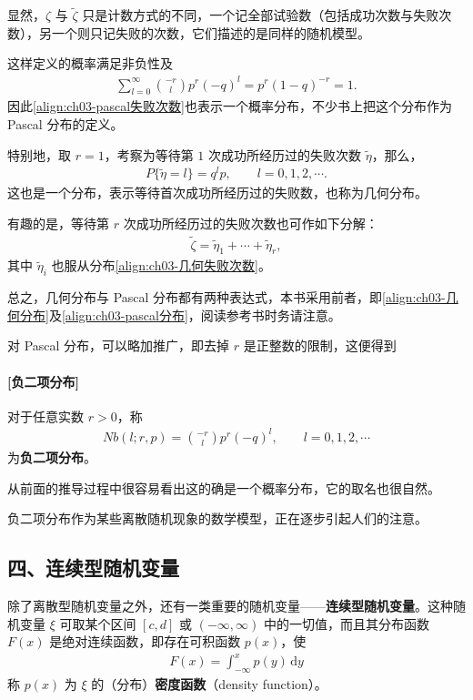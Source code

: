 \documentclass[../../main.tex]{subfiles}
\begin{document}
显然，$\zeta$ 与 $\tilde{\zeta}$ 只是计数方式的不同，一个记全部试验数（包括成功次数与失败次数），另一个则只记失败的次数，它们描述的是同样的随机模型。

这样定义的概率满足非负性及
\begin{align*}\sum_{l=0}^{\infty}\binom{-r}{l}p^{r}(-q)^{l}=p^{r}(1-q)^{-r}=1.\end{align*}
因此\eqref{align:ch03-pascal失败次数}也表示一个概率分布，不少书上把这个分布作为 Pascal 分布的定义。

特别地，取 $r=1$，考察为等待第 $1$ 次成功所经历过的失败次数 $\tilde{\eta}$，那么，
\begin{align}
P\{\tilde{\eta}=l\}=q^{l}p,\qquad l=0,1,2,\cdots.\label{align:ch03-几何失败次数}
\end{align}
这也是一个分布，表示等待首次成功所经历过的失败数，也称为几何分布。

有趣的是，等待第 $r$ 次成功所经历过的失败次数也可作如下分解：
\begin{align*}\tilde{\zeta}=\tilde{\eta}_1+\cdots+\tilde{\eta}_r,\end{align*}
其中 $\tilde{\eta}_i$ 也服从分布\eqref{align:ch03-几何失败次数}。

总之，几何分布与 Pascal 分布都有两种表达式，本书采用前者，即\eqref{align:ch03-几何分布}及\eqref{align:ch03-pascal分布}，阅读参考书时务请注意。

对 Pascal 分布，可以略加推广，即去掉 $r$ 是正整数的限制，这便得到

\paragraph{[负二项分布]}对于任意实数 $r>0$，称
\begin{align}
Nb(l;r,p)=\binom{-r}{l}p^{r}(-q)^{l},\qquad l=0,1,2,\cdots\label{align:ch03-负二项分布}
\end{align}
为\textbf{负二项分布}。

从前面的推导过程中很容易看出这的确是一个概率分布，它的取名也很自然。

负二项分布作为某些离散随机现象的数学模型，正在逐步引起人们的注意。

\subsection*{四、连续型随机变量}

除了离散型随机变量之外，还有一类重要的随机变量——\textbf{连续型随机变量}。这种随机变量 $\xi$ 可取某个区间 $[c,d]$ 或 $(-\infty,\infty)$ 中的一切值，而且其分布函数 $F(x)$ 是绝对连续函数，即存在可积函数 $p(x)$，使
\begin{align}
F(x)=\int_{-\infty}^{x}p(y)\,\mathrm{d}y\label{align:ch03-连续分布函数}
\end{align}
称 $p(x)$ 为 $\xi$ 的（分布）\textbf{密度函数}（density function）。
\end{document}
